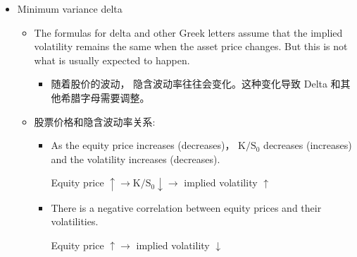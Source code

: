 \begin{itemize}
\begin{itemize}
    What implied volatility should the market-maker use to create the quote?
    
    A. 9.18\%
    
    B. 9.28\%
    
    C. 9.34\%
    
    D. 9.65\%
    
    Answer: C
    
    到期时间 7 个月介于 6 月和 1 年之间，要分别考虑 \(\mathrm{K}/\mathrm{S}0\) 为 1.05 和 1.10. 更具体的计算是采用线性插值法。
    

    
    \(\mathrm{K}/\mathrm{S}0 = {1.05}\) 时: \({9.10} + 1/{6}^{ * }\left( {{9.55} - {9.10}}\right)  = {9.175}\)
    
    \(\mathrm{K}/\mathrm{S}0 = {1.10}\) 时: \({9.45} + 1/{6}^{ * }\left( {{9.75} - {9.45}}\right)  = {9.5}\)
    

    
    求均值 \(= \left( {{9.175} + {9.5}}\right) /2 = {9.3375}\) .
    \end{itemize}
\item Minimum variance delta
    \begin{itemize}
    \item The formulas for delta and other Greek letters assume that the implied volatility remains the same when the asset price changes. But this is not what is usually expected to happen.
        \begin{itemize}
        \item 随着股价的波动， 隐含波动率往往会变化。这种变化导致 Delta 和其他希腊字母需要调整。
        \end{itemize}
    \item 股票价格和隐含波动率关系:
        \begin{itemize}

        \item  As the equity price increases (decreases)， \(\mathrm{K}/{\mathrm{S}}_{0}\) decreases (increases) and the volatility increases (decreases).
    
    Equity price \(\uparrow   \rightarrow  \mathrm{K}/{\mathrm{S}}_{0} \downarrow   \rightarrow\) implied volatility \(\uparrow\)
    
        \item  There is a negative correlation between equity prices and their volatilities.
    
    Equity price \(\uparrow   \rightarrow\) implied volatility \(\downarrow\)
    

\end{itemize}
\end{itemize}
\end{itemize}
